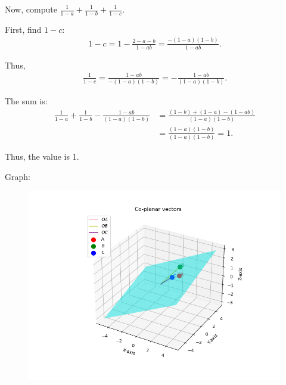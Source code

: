\documentclass[journal,12pt,onecolumn]{IEEEtran}
\begin{document}
Now, compute \(\frac{1}{1 - a} + \frac{1}{1 - b} + \frac{1}{1 - c}\).

First, find \(1 - c\):
\begin{align}
1 - c = 1 - \frac{2 - a - b}{1 - ab} = \frac{-(1 - a)(1 - b)}{1 - ab}.
\end{align}

Thus,
\begin{align}
\frac{1}{1 - c} = \frac{1 - ab}{-(1 - a)(1 - b)} = -\frac{1 - ab}{(1 - a)(1 - b)}.
\end{align}

The sum is:
\begin{align}
\frac{1}{1 - a} + \frac{1}{1 - b} - \frac{1 - ab}{(1 - a)(1 - b)} &= \frac{(1 - b) + (1 - a) - (1 - ab)}{(1 - a)(1 - b)} \\
&= \frac{(1 - a)(1 - b)}{(1 - a)(1 - b)} = 1.
\end{align}

Thus, the value is 1.


Graph:
\begin{figure}[H]
    \centering
    \includegraphics[scale=0.5]{plot}
    \caption{}
    \label{fig:plot}
\end{figure}
\end{document}
